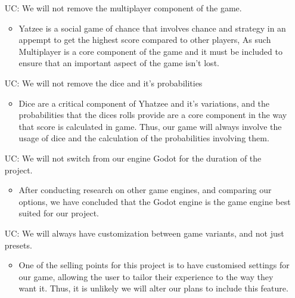 \noindent \begin{itemize}

\item[UC\refstepcounter{ucnum}\theucnum\label{LC_meaningfulLabel}:] We will not remove the multiplayer component of the game.

\begin{itemize}
	\item Yatzee is a social game of chance that involves chance and strategy in an appempt to get the highest score compared to other players, As such Multiplayer is a core component of the game and it must be included to ensure that an important aspect of the game isn't lost.
\end{itemize}

	
\item[UC\refstepcounter{ucnum}\theucnum\label{LC_meaningfulLabel}:] We will not remove the dice and it's probabilities 

\begin{itemize}
	\item Dice are a critical component of Yhatzee and it's variations, and the probabilities that the dices rolls provide are a core component in the way that score is calculated in game. Thus, our game will always involve the usage of dice and the calculation of the probabilities involving them.
\end{itemize}


\item[UC\refstepcounter{ucnum}\theucnum\label{LC_meaningfulLabel}:] We will not switch from our engine Godot for the duration of the project.

\begin{itemize}
	\item After conducting research on other game engines, and comparing our options, we have concluded that the Godot engine is the game engine best suited for our project.
\end{itemize}

\item[UC\refstepcounter{ucnum}\theucnum\label{LC_meaningfulLabel}:] We will always have customization between game variants, and not just presets.


\begin{itemize}
	\item One of the selling points for this project is to have customised settings for our game, allowing the user to tailor their experience to the way they want it. Thus, it is unlikely we will alter our plans to include this feature.
\end{itemize}


\end{itemize}
